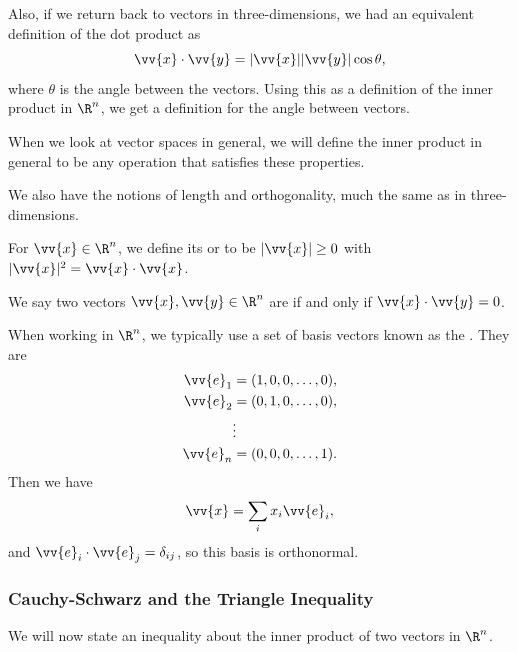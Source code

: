 Also, if we return back to vectors in three-dimensions, we had an equivalent definition of the dot product as
$$
\vv{x} \cdot \vv{y} = |\vv{x}| |\vv{y}| \cos \theta,
$$
where $\theta$ is the angle between the vectors. Using this as a definition of the inner product in $\R^n$, we get a definition for the angle between vectors.

When we look at vector spaces in general, we will define the inner product in general to be any operation that satisfies these properties.

We also have the notions of length and orthogonality, much the same as in three-dimensions.

\begin{definition}
    For $\vv{x} \in \R^n$, we define its  or  to be $|\vv{x}| \geq 0$ with $|\vv{x}|^2 = \vv{x} \cdot \vv{x}$.
\end{definition}

\begin{definition}[Orthogonality]
    We say two vectors $\vv{x}, \vv{y} \in \R^n$ are  if and only if $\vv{x} \cdot \vv{y} = 0$.
\end{definition}

When working in $\R^n$, we typically use a set of basis vectors known as the . They are
\begin{align*}
    \vv{e}_1 &= (1, 0, 0, \dots, 0), \\
    \vv{e}_2 &= (0, 1, 0, \dots, 0), \\
        &\vdots \\
        \vv{e}_n &= (0, 0, 0, \dots, 1).
\end{align*}
Then we have
$$
\vv{x} = \sum_i x_i \vv{e}_i,
$$
and $\vv{e}_i \cdot \vv{e}_j = \delta_{ij}$, so this basis is orthonormal.

\subsubsection{Cauchy-Schwarz and the Triangle Inequality}

We will now state an inequality about the inner product of two vectors in $\R^n$.

